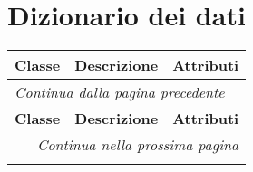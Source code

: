 \section{Dizionario dei dati}
\begin{longtable}{|p{}|p{}|p{}|}
\hline
\textbf{Classe} & \textbf{Descrizione} & \textbf{Attributi} \\
\hline
\endfirsthead

\multicolumn{3}{l}{\footnotesize\itshape Continua dalla pagina precedente} \\
\hline
\textbf{Classe} & \textbf{Descrizione} & \textbf{Attributi} \\
\hline
\endhead

\hline
\multicolumn{3}{r}{\footnotesize\itshape Continua nella prossima pagina} \\
\endfoot


\end{longtable}
